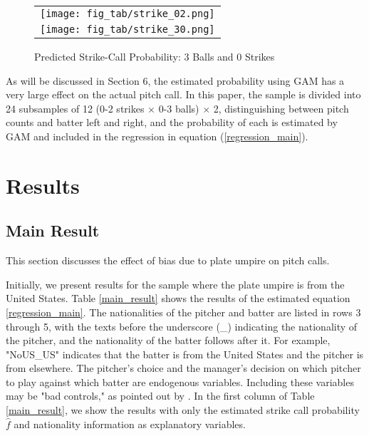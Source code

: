 \documentclass[dvipdfmx, 12pt]{jsarticle}
\begin{document}
\begin{figure}[t]
  \begin{tabular}{c}
    \begin{minipage}[ht]{.9\hsize}
      \centering
      \caption{Predicted Strike-Call Probability: 0 Balls and 2 Strikes}
      \texttt{[image: fig\_tab/strike\_02.png]}
      \label{fit_gam_02}
    \end{minipage} \\
    \begin{minipage}[t]{.9\hsize}
      \centering
      \caption{Predicted Strike-Call Probability: 3 Balls and 0 Strikes}
      \texttt{[image: fig\_tab/strike\_30.png]}
      \label{fit_gam_30}
    \end{minipage}
  \end{tabular}
\end{figure}

As will be discussed in Section 6, the estimated probability using GAM has a very large effect on the actual pitch call. In this paper, the sample is divided into 24 subsamples of 12 (0-2 strikes $\times$ 0-3 balls) $\times$ 2, distinguishing between pitch counts and batter left and right, and the probability of each is estimated by GAM and included in the regression in equation (\ref{regression_main}).

\section{Results}

\subsection{Main Result}

This section discusses the effect of bias due to plate umpire on pitch calls.

Initially, we present results for the sample where the plate umpire is from the United States. Table \ref{main_result} shows the results of the estimated equation \ref{regression_main}. The nationalities of the pitcher and batter are listed in rows 3 through 5, with the texts before the underscore (\_) indicating the nationality of the pitcher, and the nationality of the batter follows after it. For example, "NoUS\_US" indicates that the batter is from the United States and the pitcher is from elsewhere. The pitcher's choice and the manager's decision on which pitcher to play against which batter are endogenous variables. Including these variables may be "bad controls," as pointed out by \citet{Angrist2008}. In the first column of Table \ref{main_result}, we show the results with only the estimated strike call probability $\hat{f}$ and nationality information as explanatory variables.
\end{document}
